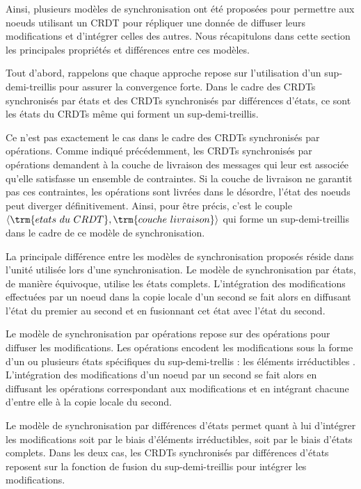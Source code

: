 \label{def:synchro-synthese}

Ainsi, plusieurs modèles de synchronisation ont été proposées pour permettre aux noeuds utilisant un \ac{CRDT} pour répliquer une donnée de diffuser leurs modifications et d'intégrer celles des autres.
Nous récapitulons dans cette section les principales propriétés et différences entre ces modèles.

Tout d'abord, rappelons que chaque approche repose sur l'utilisation d'un sup-demi-treillis pour assurer la convergence forte.
Dans le cadre des \acp{CRDT} synchronisés par états et des \acp{CRDT} synchronisés par différences d'états, ce sont les états du \acp{CRDT} même qui forment un sup-demi-treillis.

Ce n'est pas exactement le cas dans le cadre des \acp{CRDT} synchronisés par opérations.
Comme indiqué précédemment, les \acp{CRDT} synchronisés par opérations demandent à la couche de livraison des messages qui leur est associée qu'elle satisfasse un ensemble de contraintes.
Si la couche de livraison ne garantit pas ces contraintes, \eg les opérations sont livrées dans le désordre, l'état des noeuds peut diverger définitivement.
Ainsi, pour être précis, c'est le couple $\langle \trm{etats~du~CRDT},\trm{couche~livraison} \rangle$ qui forme un sup-demi-treillis dans le cadre de ce modèle de synchronisation.

La principale différence entre les modèles de synchronisation proposés réside dans l'unité utilisée lors d'une synchronisation.
Le modèle de synchronisation par états, de manière équivoque, utilise les états complets.
L'intégration des modifications effectuées par un noeud dans la copie locale d'un second se fait alors en diffusant l'état du premier au second et en fusionnant cet état avec l'état du second.

Le modèle de synchronisation par opérations repose sur des opérations pour diffuser les modifications.
Les opérations encodent les modifications sous la forme  d'un ou plusieurs états spécifiques du sup-demi-trellis : les éléments irréductibles .
L'intégration des modifications d'un noeud par un second se fait alors en diffusant les opérations correspondant aux modifications et en intégrant chacune d'entre elle à la copie locale du second.

Le modèle de synchronisation par différences d'états permet quant à lui d'intégrer les modifications soit par le biais d'éléments irréductibles, soit par le biais d'états complets.
Dans les deux cas, les \acp{CRDT} synchronisés par différences d'états reposent sur la fonction de fusion du sup-demi-treillis pour intégrer les modifications.


